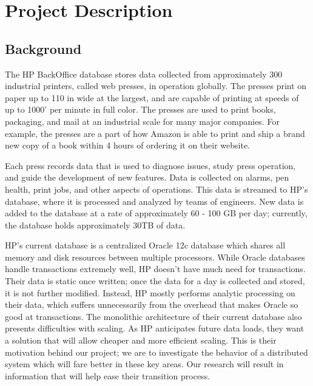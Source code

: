 \documentclass[onecolumn, draftclsnofoot,10pt, compsoc]{IEEEtran}
\begin{document}
\newpage
{}
\tableofcontents
\clearpage

\section{Project Description}
\subsection{Background}
The HP BackOffice database stores data collected from approximately 300 industrial printers, called web presses, in operation globally.
The presses print on paper up to 110 in wide at the largest, and are capable of printing at speeds of up to 1000’ per minute in full color.
The presses are used to print books, packaging, and mail at an industrial scale for many major companies.
For example, the presses are a part of how Amazon is able to print and ship a brand new copy of a book within 4 hours of ordering it on their website.

Each press records data that is used to diagnose issues, study press operation, and guide the development of new features.
Data is collected on alarms, pen health, print jobs, and other aspects of operations.
This data is streamed to HP’s database, where it is processed and analyzed by teams of engineers.
New data is added to the database at a rate of approximately 60 - 100 GB per day; currently, the database holds approximately 30TB of data. 

HP’s current database is a centralized Oracle 12c database which shares all memory and disk resources between multiple processors.
While Oracle databases handle transactions extremely well, HP doesn’t have much need for transactions. 
Their data is static once written; once the data for a day is collected and stored, it is not further modified.
Instead, HP mostly performs analytic processing on their data, which suffers unnecessarily from the overhead that makes Oracle so good at transactions.
The monolithic architecture of their current database also presents difficulties with scaling.
As HP anticipates future data loads, they want a solution that will allow cheaper and more efficient scaling.
This is their motivation behind our project; we are to investigate the behavior of a distributed system which will fare better in these key areas.
Our research will result in information that will help ease their transition process.
\end{document}
